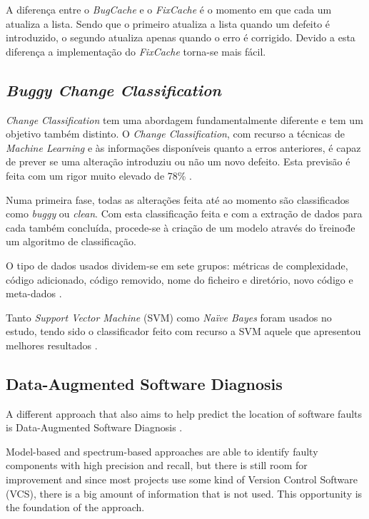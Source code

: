 A diferença entre o \emph{BugCache} e o \emph{FixCache} é o momento em que cada um atualiza a lista. Sendo que o primeiro atualiza a lista quando um defeito é introduzido, o segundo atualiza apenas quando o erro é corrigido. Devido a esta diferença a implementação do \emph{FixCache} torna-se mais fácil.

\subsection{\emph{Buggy Change Classification}}

\emph{Change Classification} tem uma abordagem fundamentalmente diferente e tem um objetivo também distinto. O \emph{Change Classification}, com recurso a técnicas de \emph{Machine Learning} e às informações disponíveis quanto a erros anteriores, é capaz de prever se uma alteração introduziu ou não um novo defeito. Esta previsão é feita com um rigor muito elevado de 78\% \cite{Whitehead2008}.

Numa primeira fase, todas as alterações feita até ao momento são classificados como \emph{buggy} ou \emph{clean}. Com esta classificação feita e com a extração de dados para cada também concluída, procede-se à criação de um modelo através do \"treino\" de um algoritmo de classificação.

O tipo de dados usados dividem-se em sete grupos: métricas de complexidade, código adicionado, código removido, nome do ficheiro e diretório, novo código e meta-dados \cite{Whitehead2008}.

Tanto \emph{Support Vector Machine} (SVM) como \emph{Naïve Bayes} foram usados no estudo, tendo sido o classificador feito com recurso a SVM aquele que apresentou melhores resultados \cite{Whitehead2008}.

\subsection{Data-Augmented Software Diagnosis} \label{subsec:elmishali}

A different approach that also aims to help predict the location of software faults is Data-Augmented Software Diagnosis \cite{Elmishali}.

Model-based and spectrum-based approaches are able to identify faulty components with high precision and recall, but there is still room for improvement and since most projects use some kind of Version Control Software (VCS), there is a big amount of information that is not used. This opportunity is the foundation of the approach.

